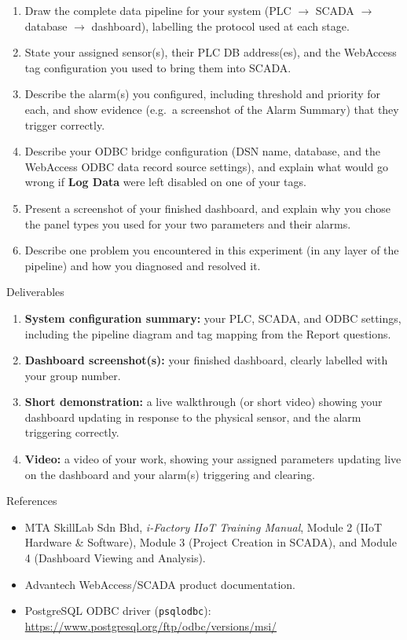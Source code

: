 \begin{reportq}
  \begin{enumerate}
    \item Draw the complete data pipeline for your system (PLC $\to$ SCADA $\to$ database $\to$ dashboard), labelling the protocol used at each stage.
    \item State your assigned sensor(s), their PLC DB address(es), and the WebAccess tag configuration you used to bring them into SCADA.
    \item Describe the alarm(s) you configured, including threshold and priority for each, and show evidence (e.g.\ a screenshot of the Alarm Summary) that they trigger correctly.
    \item Describe your ODBC bridge configuration (DSN name, database, and the WebAccess ODBC data record source settings), and explain what would go wrong if \textbf{Log Data} were left disabled on one of your tags.
    \item Present a screenshot of your finished dashboard, and explain why you chose the panel types you used for your two parameters and their alarms.
    \item Describe one problem you encountered in this experiment (in any layer of the pipeline) and how you diagnosed and resolved it.
  \end{enumerate}
\end{reportq}

\begin{labsection}{Deliverables}{}
  \begin{enumerate}
    \item \textbf{System configuration summary:} your PLC, SCADA, and ODBC settings, including the pipeline diagram and tag mapping from the Report questions.
    \item \textbf{Dashboard screenshot(s):} your finished dashboard, clearly labelled with your group number.
    \item \textbf{Short demonstration:} a live walkthrough (or short video) showing your dashboard updating in response to the physical sensor, and the alarm triggering correctly.
    \item \textbf{Video:} a video of your work, showing your assigned parameters updating live on the dashboard and your alarm(s) triggering and clearing.
  \end{enumerate}
\end{labsection}

\begin{labsection}{References}{}
  \begin{itemize}
    \item MTA SkillLab Sdn Bhd, \textit{i-Factory IIoT Training Manual}, Module 2 (IIoT Hardware \& Software), Module 3 (Project Creation in SCADA), and Module 4 (Dashboard Viewing and Analysis).
    \item Advantech WebAccess/SCADA product documentation.
    \item PostgreSQL ODBC driver (\texttt{psqlodbc}): \url{https://www.postgresql.org/ftp/odbc/versions/msi/}
  \end{itemize}
\end{labsection}

